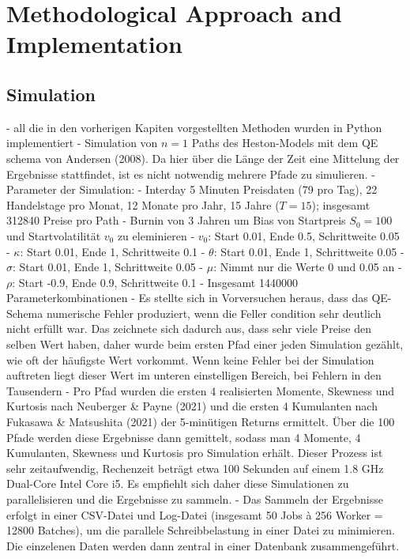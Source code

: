 \label{sec:methodical_approach}
\section{Methodological Approach and Implementation}

\subsection{Simulation}
- all die in den vorherigen Kapiten vorgestellten Methoden wurden in Python implementiert
- Simulation von $n=1$ Paths des Heston-Models mit dem QE schema von Andersen (2008). Da hier über die Länge der Zeit eine Mittelung der Ergebnisse stattfindet, ist es nicht notwendig mehrere Pfade zu simulieren.
- Parameter der Simulation:
    - Interday 5 Minuten Preisdaten (79 pro Tag), 22 Handelstage pro Monat, 12 Monate pro Jahr, 15 Jahre ($T = 15$); insgesamt 312840 Preise pro Path
    - Burnin von 3 Jahren um Bias von Startpreis $S_0 = 100$ und Startvolatilität $v_0$ zu eleminieren
    - $v_0$: Start 0.01, Ende 0.5, Schrittweite 0.05
    - $\kappa$: Start 0.01, Ende 1, Schrittweite 0.1
    - $\theta$: Start 0.01, Ende 1, Schrittweite 0.05
    - $\sigma$: Start 0.01, Ende 1, Schrittweite 0.05
    - $\mu$: Nimmt nur die Werte 0 und 0.05 an
    - $\rho$: Start -0.9, Ende 0.9, Schrittweite 0.1
    - Insgesamt 1440000 Parameterkombinationen
- Es stellte sich in Vorversuchen heraus, dass das QE-Schema numerische Fehler produziert, wenn die Feller condition sehr deutlich nicht erfüllt war. Das zeichnete sich dadurch aus, dass sehr viele Preise den selben Wert haben, daher wurde beim ersten Pfad einer jeden Simulation gezählt, wie oft der häufigste Wert vorkommt. Wenn keine Fehler bei der Simulation auftreten liegt dieser Wert im unteren einstelligen Bereich, bei Fehlern in den Tausendern %
- Pro Pfad wurden die ersten 4 realisierten Momente, Skewness und Kurtosis nach Neuberger & Payne (2021) und die ersten 4 Kumulanten nach Fukasawa & Matsushita (2021) der 5-minütigen Returns ermittelt. Über die 100 Pfade werden diese Ergebnisse dann gemittelt, sodass man 4 Momente, 4 Kumulanten, Skewness und Kurtosis pro Simulation erhält. Dieser Prozess ist sehr zeitaufwendig, Rechenzeit beträgt etwa 100 Sekunden auf einem 1.8 GHz Dual-Core Intel Core i5. Es empfiehlt sich daher diese Simulationen zu parallelisieren und die Ergebnisse zu sammeln.
- Das Sammeln der Ergebnisse erfolgt in einer CSV-Datei und Log-Datei (insgesamt 50 Jobs à 256 Worker = 12800 Batches), um die parallele Schreibbelastung in einer Datei zu minimieren. Die einzelenen Daten werden dann zentral in einer Datenbank zusammengeführt.

